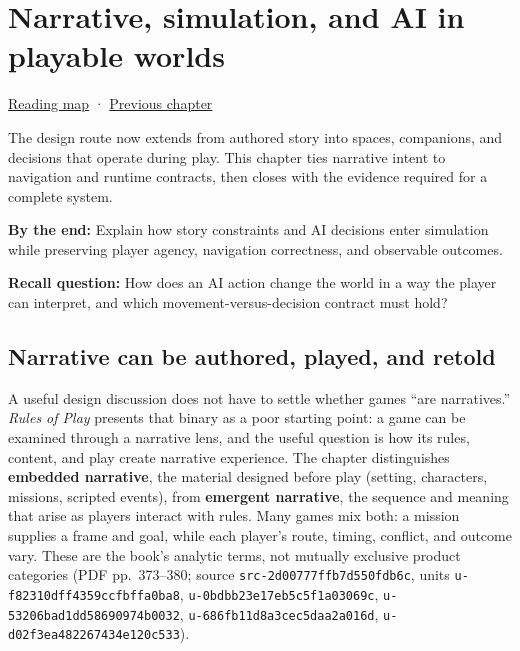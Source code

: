\hypertarget{06-engine-ii-ch047}{}
\chapter{Narrative, simulation, and AI in playable worlds}\label{stagechapter:06-engine-ii-ch047}\label{06-engine-ii-ch047-narrative-simulation-and-ai-in-playable-worlds}

\hyperref[volume-reading-map]{Reading map} · \hyperref[06-engine-ii-ch046-game-design-from-mechanics-to-narrative-interfaces]{Previous chapter}

The design route now extends from authored story into spaces, companions, and decisions that operate during play. This chapter ties narrative intent to navigation and runtime contracts, then closes with the evidence required for a complete system.

\textbf{By the end:} Explain how story constraints and AI decisions enter simulation while preserving player agency, navigation correctness, and observable outcomes.

\textbf{Recall question:} How does an AI action change the world in a way the player can interpret, and which movement-versus-decision contract must hold?

\section{Narrative can be authored, played, and retold}\label{06-engine-ii-ch047-narrative-can-be-authored-played-and-retold}

A useful design discussion does not have to settle whether games ``are narratives.'' \emph{Rules of Play} presents that binary as a poor starting point: a game can be examined through a narrative lens, and the useful question is how its rules, content, and play create narrative experience. The chapter distinguishes \textbf{embedded narrative}, the material designed before play (setting, characters, missions, scripted events), from \textbf{emergent narrative}, the sequence and meaning that arise as players interact with rules. Many games mix both: a mission supplies a frame and goal, while each player's route, timing, conflict, and outcome vary. These are the book's analytic terms, not mutually exclusive product categories (PDF pp.~373--380; source \texttt{src-2d00777ffb7d550fdb6c}, units \texttt{u-f82310dff4359ccfbffa0ba8}, \texttt{u-0bdbb23e17eb5c5f1a03069c}, \texttt{u-53206bad1dd58690974b0032}, \texttt{u-686fb11d8a3cec5daa2a016d}, \texttt{u-d02f3ea482267434e120c533}).

